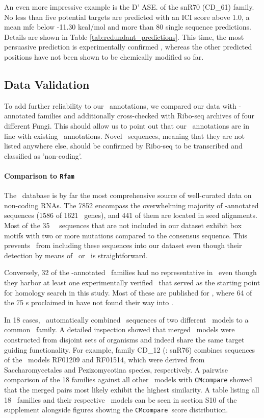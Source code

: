 An even more impressive example is the D' ASE. of the snR70 (CD\_61)
family.  No less than five potential targets are predicted with an ICI
score above 1.0, a mean mfe below -11.30 kcal/mol and more than 80 single
sequence predictions. Details are shown in Table
\ref{tab:redundant_predictions}. This time, the most persuasive prediction
is experimentally confirmed \cite{Lowe:1999}, whereas the other predicted
positions have not been shown to be chemically modified so far.

\subsection{Data Validation}

To add further reliability to our \sno\ annotations, we compared our data
with \rfam -annotated families and additionally cross-checked with Ribo-seq
archives of four different Fungi. This should allow us to point out that
our \snostrip\ annotations are in line with existing \rfam\
annotations. Novel \sno\ sequences, meaning that they are not listed
anywhere else, should be confirmed by Ribo-seq to be transcribed and
classified as 'non-coding'.
 
\paragraph{\textbf{Comparison to \texttt{Rfam}}}
The \rfam\ database \cite{Nawrocki:2015} is by far the most
comprehensive source of well-curated data on non-coding RNAs. The 7852
\PFS{\sno s detected by \snostrip} encompass the overwhelming majority
of \rfam -annotated sequences (1586 of 1621 \sno\ genes), and 441 of
them are located in seed alignments.  Most of the 35 \rfam\ \sno\
sequences that are not included in our dataset exhibit box motifs with
two or more mutations compared to the consensus sequence. This
prevents \snostrip\ from including these sequences into our dataset
even though their detection by means of \blast\ or \infernal\ is
straightforward.

Conversely, 32 of the \snostrip -annotated \sno\ families had no
representative in \rfam\ even though they harbor at least one
experimentally verified \sno\ that served as the starting point for
homology search in this study. Most of these are published for \ncr, where
64 of the 75 \sno s proclaimed in \cite{Liu:2009} have not found their way
into \rfam.

In 18 cases, \snostrip\ automatically combined \sno\ sequences of two
different \rfam\ models to a common \sno\ family. A detailed inspection
showed that merged \rfam\ models were constructed from disjoint sets of
organisms and indeed share the same target guiding functionality. For
example, family CD\_12 (\sce: snR76) combines sequences of the \rfam\
models RF01209 and RF01514, which were derived from Saccharomycetales and
Pezizomycotina species, respectively. A pairwise comparison of the 18
families against all other \rfam\ models with \texttt{CMcompare}
\cite{Eggenhofer:2013} showed that the merged pairs most likely exhibit the
highest similarity. A table listing all 18 \sno\ families and their
respective \rfam\ models can be seen in section S10 of the supplement
alongside figures showing the \texttt{CMcompare}\ score distribution.  

